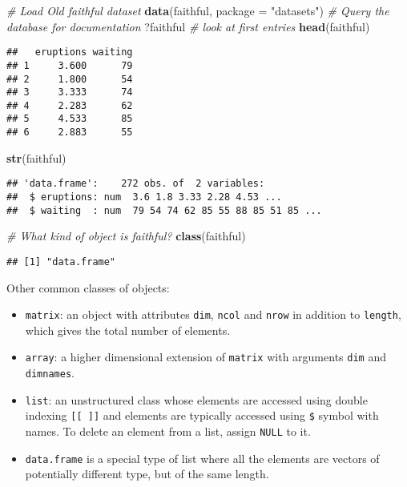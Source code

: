 \documentclass[]{book}
\newenvironment{Shaded}{\begin{snugshade}}{\end{snugshade}}
\newcommand{\CommentTok}[1]{\textcolor[rgb]{0.56,0.35,0.01}{\textit{#1}}}
\newcommand{\DataTypeTok}[1]{\textcolor[rgb]{0.13,0.29,0.53}{#1}}
\newcommand{\KeywordTok}[1]{\textcolor[rgb]{0.13,0.29,0.53}{\textbf{#1}}}
\newcommand{\NormalTok}[1]{#1}
\newcommand{\StringTok}[1]{\textcolor[rgb]{0.31,0.60,0.02}{#1}}
\providecommand{\tightlist}{%
  \setlength{\itemsep}{0pt}\setlength{\parskip}{0pt}}
\theoremstyle{definition}
\theoremstyle{definition}
\theoremstyle{definition}
\theoremstyle{remark}
\begin{document}
\begin{Shaded}
\begin{Highlighting}[]
\CommentTok{# Load Old faithful dataset}
\KeywordTok{data}\NormalTok{(faithful, }\DataTypeTok{package =} \StringTok{"datasets"}\NormalTok{)}
\CommentTok{# Query the database for documentation}
\NormalTok{?faithful}
\CommentTok{# look at first entries}
\KeywordTok{head}\NormalTok{(faithful)}
\end{Highlighting}
\end{Shaded}

\begin{verbatim}
##   eruptions waiting
## 1     3.600      79
## 2     1.800      54
## 3     3.333      74
## 4     2.283      62
## 5     4.533      85
## 6     2.883      55
\end{verbatim}

\begin{Shaded}
\begin{Highlighting}[]
\KeywordTok{str}\NormalTok{(faithful)}
\end{Highlighting}
\end{Shaded}

\begin{verbatim}
## 'data.frame':    272 obs. of  2 variables:
##  $ eruptions: num  3.6 1.8 3.33 2.28 4.53 ...
##  $ waiting  : num  79 54 74 62 85 55 88 85 51 85 ...
\end{verbatim}

\begin{Shaded}
\begin{Highlighting}[]
\CommentTok{# What kind of object is faithful? }
\KeywordTok{class}\NormalTok{(faithful)}
\end{Highlighting}
\end{Shaded}

\begin{verbatim}
## [1] "data.frame"
\end{verbatim}

Other common classes of objects:

\begin{itemize}
\tightlist
\item
  \texttt{matrix}: an object with attributes \texttt{dim}, \texttt{ncol} and \texttt{nrow} in addition to \texttt{length}, which gives the total number of elements.
\item
  \texttt{array}: a higher dimensional extension of \texttt{matrix} with arguments \texttt{dim} and \texttt{dimnames}.
\item
  \texttt{list}: an unstructured class whose elements are accessed using double indexing \texttt{{[}{[}\ {]}{]}} and elements are typically accessed using \texttt{\$} symbol with names. To delete an element from a list, assign \texttt{NULL} to it.
\item
  \texttt{data.frame} is a special type of list where all the elements are vectors of potentially different type, but of the same length.
\end{itemize}
\end{document}
